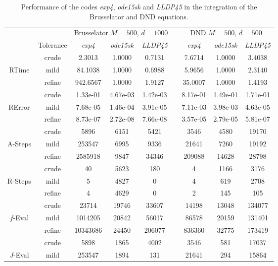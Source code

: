 \begin{table}[h]
	\caption{Performance of the codes \emph{exp4}, \emph{ode15sk} and  \emph{LLDP45} in the integration of the Brusselator and DND equations.}
	\begin{adjustbox}{width=0.8\columnwidth,center}
	\begin{tabular}{  ccccccccc }
		\hline
		& & \multicolumn{3}{c}{Brusselator $M=500$, $d=1000$ } & & \multicolumn{3}{c}{DND $M=500$, $d=500$}\\
		\cline{3-5} \cline{7-9}
		& Tolerance & \emph{exp4} & \emph{ode15sk} & \emph{LLDP45} & & \emph{exp4} & \emph{ode15sk} & \emph{LLDP45} \\
		\hline
		& crude & 2.3013 & 1.0000 & 0.7131  & & 7.6714 & 1.0000 & 3.4038 \\
		RTime  & mild & 84.1038 & 1.0000 & 0.6988  & & 5.9656 & 1.0000 & 2.3140  \\
		& refine & 942.6567 & 1.0000 & 1.9127  & & 35.0007 & 1.0000 & 1.4193 \\
		\hline
		& crude & 1.33e-01 & 4.67e-03 & 1.42e-03  & & 8.17e-01 & 1.49e-01 & 1.71e-01 \\
		RError  & mild & 7.68e-05 & 1.46e-04 & 3.91e-05  & & 7.11e-03 & 3.98e-03 & 4.63e-05 \\
		& refine & 8.73e-07 & 2.72e-08 & 7.66e-08  & & 3.57e-05 & 2.79e-05 & 5.81e-07 \\
		\hline
		& crude & 5896 & 6151 & 5421 &  & 3546 & 4580 & 19170 \\
		A-Steps  & mild & 253547 & 6995 & 9336  & & 21641 & 7260 & 19192 \\
		& refine & 2585918 & 9847 & 34346  & & 209088 & 14628 & 28798 \\
		\hline
		& crude & 40 & 5623 & 180  & & 4 & 1166 & 3176 \\
		R-Steps  & mild & 5 & 4827 & 0  & & 4 & 619 & 2708 \\
		& refine & 4 & 4629 & 0  & & 2 & 145 & 105 \\
		\hline
		& crude & 23714 & 19746 & 33607  & & 14198 & 13048 & 134077 \\
		$f$-Eval  & mild & 1014205 & 20842 & 56017  & & 86578 & 20159 & 131401 \\
		& refine & 10343686 & 24450 & 206077  & & 836360 & 32775 & 173419 \\
		\hline
		& crude & 5898 & 1865 & 4002 &  & 3546 & 581 & 17037 \\
		$J$-Eval  & mild & 253547 & 1894 & 131 & &  21641 & 294 & 15864  \\

\end{tabular}
\end{adjustbox}
\end{table}
